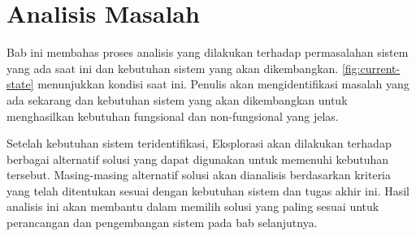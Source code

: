 \chapter{Analisis Masalah}
\label{chap:analisis-masalah}
Bab ini membahas proses analisis yang dilakukan terhadap permasalahan sistem yang ada saat ini dan kebutuhan sistem yang akan dikembangkan. \autoref{fig:current-state} menunjukkan kondisi saat ini. Penulis akan mengidentifikasi masalah yang ada sekarang dan kebutuhan sistem yang akan dikembangkan untuk menghasilkan kebutuhan fungsional dan non-fungsional yang jelas. 

Setelah kebutuhan sistem teridentifikasi, Eksplorasi akan dilakukan terhadap berbagai alternatif solusi yang dapat digunakan untuk memenuhi kebutuhan tersebut. Masing-masing alternatif solusi akan dianalisis berdasarkan kriteria yang telah ditentukan sesuai dengan kebutuhan sistem dan tugas akhir ini. Hasil analisis ini akan membantu dalam memilih solusi yang paling sesuai untuk perancangan dan pengembangan sistem pada bab selanjutnya.





